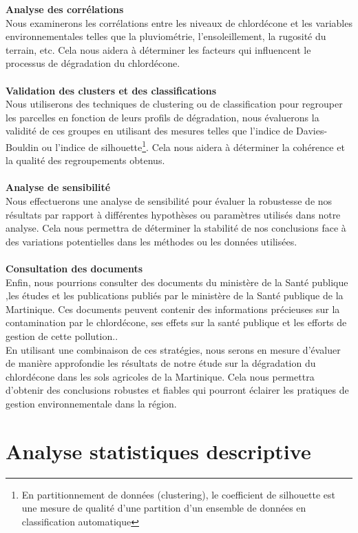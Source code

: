 \documentclass{report}
\begin{document}
\large\textbf{Analyse des corrélations}\\
Nous examinerons les corrélations entre les niveaux de chlordécone et les variables environnementales telles que la pluviométrie, l'ensoleillement, la rugosité du terrain, etc. Cela nous aidera à déterminer les facteurs qui influencent le processus de dégradation du chlordécone.\\\\
\large\textbf{Validation des clusters et des classifications}\\
 Nous utiliserons des techniques de clustering ou de classification pour regrouper les parcelles en fonction de leurs profils de dégradation, nous évaluerons la validité de ces groupes en utilisant des mesures telles que l'indice de Davies-Bouldin ou l'indice de silhouette\footnote{En partitionnement de données (clustering), le coefficient de silhouette est une mesure de qualité d'une partition d'un ensemble de données en classification automatique}. Cela nous aidera à déterminer la cohérence et la qualité des regroupements obtenus.\\\\
\large\textbf{Analyse de sensibilité}\\
 Nous effectuerons une analyse de sensibilité pour évaluer la robustesse de nos résultats par rapport à différentes hypothèses ou paramètres utilisés dans notre analyse. Cela nous permettra de déterminer la stabilité de nos conclusions face à des variations potentielles dans les méthodes ou les données utilisées.\\\\
\large\textbf{Consultation des documents}\\
Enfin, nous pourrions consulter des documents du ministère de la Santé publique ,les études et les publications publiés par le ministère de la Santé publique de la Martinique. Ces documents peuvent contenir des informations précieuses sur la contamination par le chlordécone, ses effets sur la santé publique et les efforts de gestion de cette pollution..\\
 
En utilisant une combinaison de ces stratégies, nous serons en mesure d'évaluer de manière approfondie les résultats de notre étude sur la dégradation du chlordécone dans les sols agricoles de la Martinique. Cela nous permettra d'obtenir des conclusions robustes et fiables qui pourront éclairer les pratiques de gestion environnementale dans la région.

\section*{Analyse statistiques descriptive}
\end{document}
